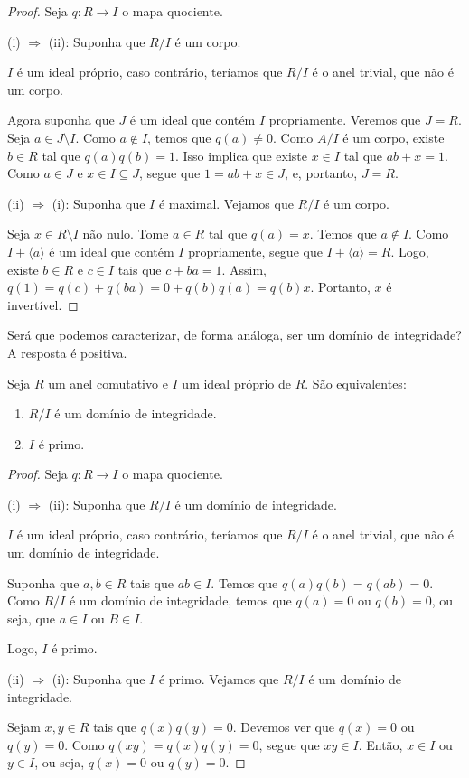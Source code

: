 \begin{proof}
    Seja $q:R\rightarrow I$ o mapa quociente.

    (i) $\Rightarrow$ (ii): Suponha que $R/I$ é um corpo.
    

    $I$ é um ideal próprio, caso contrário, teríamos que $R/I$ é o anel trivial, que não é um corpo.

    Agora suponha que $J$ é um ideal que contém $I$ propriamente.
    Veremos que $J=R$.
    Seja $a \in J\setminus I$.
    Como $a\notin I$, temos que $q(a)\neq 0$.
    Como $A/I$ é um corpo, existe $b \in R$ tal que $q(a)q(b)=1$.
    Isso implica que existe $x \in I$ tal que $ab+x=1$.
    Como $a \in J$ e $x \in I\subseteq J$, segue que $1=ab+x\in J$, e, portanto, $J=R$.

    (ii) $\Rightarrow$ (i): Suponha que $I$ é maximal. Vejamos que $R/I$ é um corpo.

    Seja $x \in R\setminus I$ não nulo.
    Tome $a \in R$ tal que $q(a)=x$.
    Temos que $a \notin I$.
    Como $I+\langle a\rangle$ é um ideal que contém $I$ propriamente, segue que $I+\langle a\rangle=R$.
    Logo, existe $b \in R$ e $c \in I$ tais que $c+ba=1$.
    Assim, $q(1)=q(c)+q(ba)=0+q(b)q(a)=q(b)x$.
    Portanto, $x$ é invertível.
\end{proof}

Será que podemos caracterizar, de forma análoga, ser um domínio de integridade? A resposta é positiva.

\begin{prop}
    Seja $R$ um anel comutativo e $I$ um ideal próprio de $R$. São equivalentes:
    
    \begin{enumerate}[label=(\roman*)]
        \item $R/I$ é um domínio de integridade.
        \item $I$ é primo.
    \end{enumerate}
\end{prop}

\begin{proof}
    Seja $q:R\rightarrow I$ o mapa quociente.

    (i) $\Rightarrow$ (ii): Suponha que $R/I$ é um domínio de integridade.
    

    $I$ é um ideal próprio, caso contrário, teríamos que $R/I$ é o anel trivial, que não é um domínio de integridade.

    Suponha que $a,b \in R$ tais que $ab \in I$.
    Temos que $q(a)q(b)=q(ab)=0$.
    Como $R/I$ é um domínio de integridade, temos que $q(a)=0$ ou $q(b)=0$, ou seja, que $a \in I$ ou $B \in I$.

    Logo, $I$ é primo.

    (ii) $\Rightarrow$ (i): Suponha que $I$ é primo.
    Vejamos que $R/I$ é um domínio de integridade.

    Sejam $x, y \in R$ tais que $q(x)q(y)=0$.
    Devemos ver que $q(x)=0$ ou $q(y)=0$.
    Como $q(xy)=q(x)q(y)=0$, segue que $xy\in I$.
    Então, $x\in I$ ou $y\in I$, ou seja, $q(x)=0$ ou $q(y)=0$.
\end{proof}

